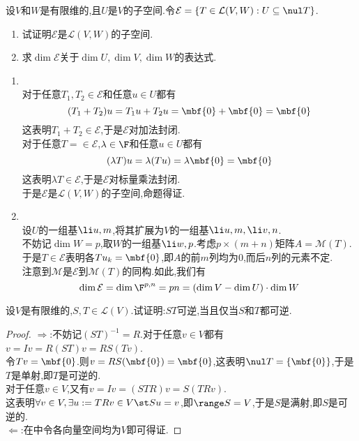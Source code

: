 \documentclass{ctexart}
\begin{document}
\begin{problem}[10.]
    设$V$和$W$是有限维的,且$U$是$V$的子空间.令$\mathcal{E}=\left\{T\in\mathcal{L}(V,W):U\subseteq\nul T\right\}$.
    \begin{enumerate}[label=\tbf{(\arabic*)}]
        \item 试证明$\mathcal{E}$是$\mathcal{L}(V,W)$的子空间.
        \item 求$\dim\mathcal{E}$关于$\dim U,\dim V,\dim W$的表达式.
    \end{enumerate}
\end{problem}
\begin{solution}
    \begin{enumerate}[label=\tbf{(\arabic*)}]
        \item {}\\
            对于任意$T_1,T_2\in\mathcal{E}$和任意$u\in U$都有
            $$(T_1+T_2)u=T_1u+T_2u=\mbf{0}+\mbf{0}=\mbf{0}$$
            这表明$T_1+T_2\in\mathcal{E}$,于是$\mathcal{E}$对加法封闭.\\
            对于任意$T=\in\mathcal{E}$,$\lambda\in\F$和任意$u\in U$都有
            $$(\lambda T)u=\lambda(Tu)=\lambda\mbf{0}=\mbf{0}$$
            这表明$\lambda T\in\mathcal{E}$,于是$\mathcal{E}$对标量乘法封闭.\\
            于是$\mathcal{E}$是$\mathcal{L}(V,W)$的子空间,命题得证.
        \item {}\\
            设$U$的一组基$\li u,m$,将其扩展为$V$的一组基$\li u,m,\li v,n$.\\
            不妨记$\dim W=p$,取$W$的一组基$\li w,p$.考虑$p\times (m+n)$矩阵$A=\mathcal{M}(T)$.\\
            于是$T\in\mathcal{E}$表明各$Tu_k=\mbf{0}$,即$A$的前$m$列均为$0$,而后$n$列的元素不定.\\
            注意到$\mathcal{M}$是$\mathcal{E}$到$\mathcal{M}(T)$的同构.如此,我们有
            $$\dim\mathcal{E}=\dim\F^{p,n}=pn=(\dim V-\dim U)\cdot\dim W$$
    \end{enumerate}
\end{solution}
\begin{problem}[11.]
    设$V$是有限维的,$S,T\in\mathcal{L}(V)$.试证明:$ST$可逆,当且仅当$S$和$T$都可逆.
\end{problem}
\begin{proof}
    $\Rightarrow$:不妨记$(ST)^{-1}=R$.对于任意$v\in V$都有$v=Iv=R(ST)v=RS(Tv)$.\\
    令$Tv=\mbf{0}$.则$v=RS(\mbf{0})=\mbf{0}$,这表明$\nul T=\left\{\mbf{0}\right\}$,于是$T$是单射,即$T$是可逆的.\\
    对于任意$v\in V$,又有$v=Iv=(STR)v=S(TRv)$.\\
    这表明$\forall v\in V,\exists u:=TRv\in V\st Su=v$,即$\range S=V$,于是$S$是满射,即$S$是可逆的.\\
    $\Leftarrow$:在中令各向量空间均为$V$即可得证.
\end{proof}
\end{document}
